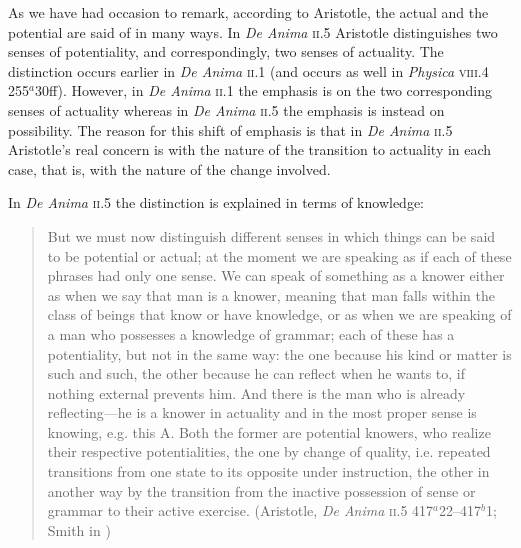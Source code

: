 As we have had occasion to remark, according to Aristotle, the actual and the potential are said of in many ways. In \emph{De Anima} \textsc{ii}.5 Aristotle distinguishes two senses of potentiality, and correspondingly, two senses of actuality. The distinction occurs earlier in \emph{De Anima} \textsc{ii}.1 (and occurs as well in \emph{Physica} \textsc{viii}.4 255\( ^{a} \)30ff). However, in \emph{De Anima} \textsc{ii}.1 the emphasis is on the two corresponding senses of actuality whereas in \emph{De Anima} \textsc{ii}.5 the emphasis is instead on possibility. The reason for this shift of emphasis is that in \emph{De Anima} \textsc{ii}.5 Aristotle's real concern is with the nature of the transition to actuality in each case, that is, with the nature of the change involved.  

In \emph{De Anima} \textsc{ii}.5 the distinction is explained in terms of knowledge:
\begin{quote}
	But we must now distinguish different senses in which things can be said to be potential or actual; at the moment we are speaking as if each of these phrases had only one sense. We can speak of something as a knower either as when we say that man is a knower, meaning that man falls within the class of beings that know or have knowledge, or as when we are speaking of a man who possesses a knowledge of grammar; each of these has a potentiality, but not in the same way: the one because his kind or matter is such and such, the other because he can reflect when he wants to, if nothing external prevents him. And there is the man who is already reflecting---he is a knower in actuality and in the most proper sense is knowing, e.g. this A. Both the former are potential knowers, who realize their respective potentialities, the one by change of quality, i.e. repeated transitions from one state to its opposite under instruction, the other in another way by the transition from the inactive possession of sense or grammar to their active exercise. (Aristotle, \emph{De Anima} \textsc{ii}.5 417\( ^{a} \)22--417\( ^{b} \)1; Smith in \citealt[30]{Barnes:1984uq})
\end{quote}

